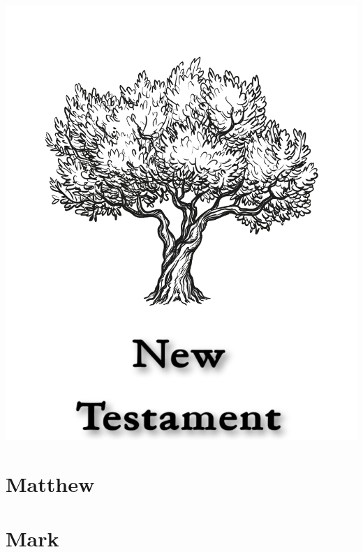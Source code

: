 \null\vfill
\begin{center}
\begin{minipage}[c]{\textwidth}
  \begin{center}
  \includegraphics{NewTestamentTitle.pdf}
  \end{center}
\end{minipage}
\end{center}
\null\vfill
\newpage

\pagestyle{bible}

\chapter{Matthew}
\begin{multicols}{2}
  \raggedcolumns
  \parskip=0pt \relax
  
\end{multicols}

\chapter{Mark}
\begin{multicols}{2}
  \raggedcolumns
  \parskip=0pt \relax
  
\end{multicols}

